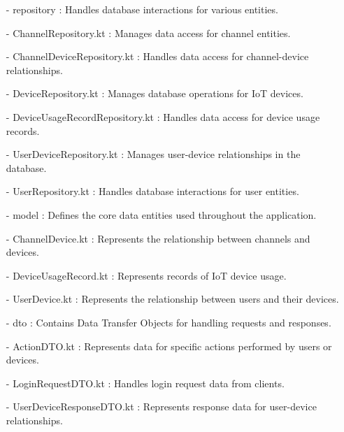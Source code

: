 \documentclass[conference]{IEEEtran}
\begin{document}
\begin{enumerate}
\begin{itemize}
\begin{itemize}
\begin{enumerate}
\begin{enumerate}
        \item[-] repository : Handles database interactions for various entities.\\
        \item[-] ChannelRepository.kt : Manages data access for channel entities.\\
        \item[-] ChannelDeviceRepository.kt : Handles data access for channel-device relationships.\\
        \item[-] DeviceRepository.kt : Manages database operations for IoT devices.\\
        \item[-] DeviceUsageRecordRepository.kt : Handles data access for device usage records.\\
        \item[-] UserDeviceRepository.kt : Manages user-device relationships in the database.\\
        \item[-] UserRepository.kt : Handles database interactions for user entities.\\
        
        \item[-] model : Defines the core data entities used throughout the application.\\
        \item[-] ChannelDevice.kt : Represents the relationship between channels and devices.\\
        \item[-] DeviceUsageRecord.kt : Represents records of IoT device usage.\\
        \item[-] UserDevice.kt : Represents the relationship between users and their devices.\\

        \item[-] dto : Contains Data Transfer Objects for handling requests and responses.\\
        \item[-] ActionDTO.kt : Represents data for specific actions performed by users or devices. \\
        \item[-] LoginRequestDTO.kt : Handles login request data from clients.\\
        \item[-] UserDeviceResponseDTO.kt : Represents response data for user-device relationships.\\
        

\end{enumerate}
\end{enumerate}
\end{itemize}
\end{itemize}
\end{enumerate}
\end{document}
